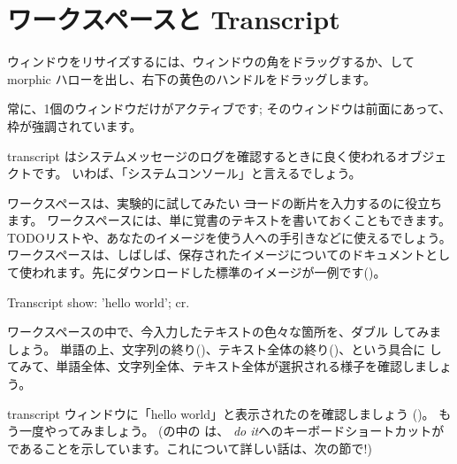 \documentclass[a4paper,10pt,twoside]{book}
\begin{document}
\section{ワークスペースと Transcript}


ウィンドウをリサイズするには、ウィンドウの角をドラッグするか、\metaclick して morphic ハローを出し、右下の黄色のハンドルをドラッグします。

常に、1個のウィンドウだけがアクティブです; そのウィンドウは前面にあって、枠が強調されています。

transcript はシステムメッセージのログを確認するときに良く使われるオブジェクトです。
いわば、「システムコンソール」と言えるでしょう。

ワークスペースは、実験的に試してみたい \st コードの断片を入力するのに役立ちます。
ワークスペースには、単に覚書のテキストを書いておくこともできます。TODOリストや、あなたのイメージを使う人への手引きなどに使えるでしょう。
ワークスペースは、しばしば、保存されたイメージについてのドキュメントとして使われます。先にダウンロードした標準のイメージが一例です()。

\begin{code}{}
Transcript show: 'hello world'; cr.
\end{code}

ワークスペースの中で、今入力したテキストの色々な箇所を、ダブル \click してみましょう。
単語の上、文字列の終り()、テキスト全体の終り()、という具合に \click してみて、単語全体、文字列全体、テキスト全体が選択される様子を確認しましょう。

transcript ウィンドウに「hello world」と表示されたのを確認しましょう
()。
もう一度やってみましょう。
(の中の は、 \emph{do it}へのキーボードショートカットが であることを示しています。これについて詳しい話は、次の節で!)
\end{document}
